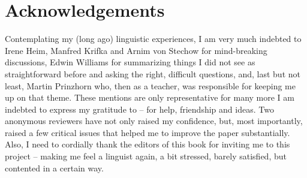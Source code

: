 \documentclass[output=paper,colorlinks,citecolor=brown,
]{langscibook}
\begin{document}

\section*{Acknowledgements}

Contemplating my (long ago) linguistic experiences, I am very much indebted to Irene Heim, Manfred Krifka and Arnim von Stechow for mind-breaking discussions, Edwin Williams for summarizing things I did not see as straightforward before and asking the right, difficult questions, and, last but not least, Martin Prinzhorn who, then as a teacher, was responsible for keeping me up on that theme. These mentions are only representative for many more I am indebted to express my gratitude to -- for help, friendship and ideas. Two anonymous reviewers have not only raised my confidence, but, most importantly, raised a few critical issues that helped me to improve the paper substantially. Also, I need to cordially thank the editors of this book for inviting me to this project -- making
me feel a linguist again, a bit stressed, barely satisfied, but contented in a certain way.
\end{document}
